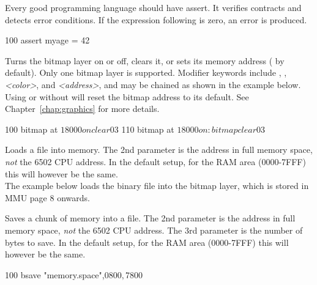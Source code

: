 \begin{entry}
Every good programming language should have assert. It verifies contracts and detects error conditions. If the expression following is zero, an error is produced.

\begin{lstexample}
100 assert myage = 42
\end{lstexample}
\end{entry}

\begin{entry}
Turns the bitmap layer on or off, clears it, or sets its memory address ( by default). Only one bitmap layer is supported. Modifier keywords include , ,  \textit{<color>}, and  \textit{<address>}, and may be chained as shown in the example below. Using  or  without  will reset the bitmap address to its default. See Chapter~\ref{chap:graphics} for more details.

\begin{lstexample}
100 bitmap at $18000 on clear $03
110 bitmap at $18000 on: bitmap clear $03
\end{lstexample}
\end{entry}

\begin{entry}
Loads a file into memory. The 2nd parameter is the address in full memory space, \emph{not} the 6502 CPU address. In the default setup, for the RAM area (0000-7FFF) this will however be the same.\\

The example below loads the binary file  into the bitmap layer, which is stored in MMU page 8 onwards.

\end{entry}

\begin{entry}
Saves a chunk of memory into a file. The 2nd parameter is the address in full memory space, \emph{not} the 6502 CPU address. The 3rd parameter is the number of bytes to save. In the default setup, for the RAM area (0000-7FFF) this will however be the same.


\begin{lstexample}
100 bsave "memory.space",$0800,$7800
\end{lstexample}
\end{entry}

